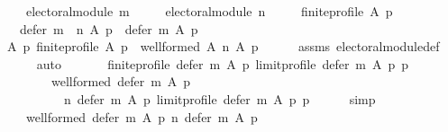\begin{isabellebody}
\ \ \ \ {\isachardoublequoteopen}electoral{\isacharunderscore}{\kern0pt}module\ m{\isachardoublequoteclose}\ \isanewline
\ \ \ \ {\isachardoublequoteopen}electoral{\isacharunderscore}{\kern0pt}module\ n{\isachardoublequoteclose}\ \isanewline
\ \ \ \ {\isachardoublequoteopen}finite{\isacharunderscore}{\kern0pt}profile\ A\ p{\isachardoublequoteclose}\isanewline
\ \ \ {\isachardoublequoteopen}defer\ {\isacharparenleft}{\kern0pt}m\ {\isasymtriangleright}\ n{\isacharparenright}{\kern0pt}\ A\ p\ {\isasymsubseteq}\ defer\ m\ A\ p{\isachardoublequoteclose}\isanewline
%
\isadelimproof
%
\endisadelimproof
%
\isatagproof
{}\isamarkupfalse%
\ {\isacharminus}{\kern0pt}\isanewline
\ \ \isamarkupfalse%
\ {\isachardoublequoteopen}{\isasymforall}A\ p{\isachardot}{\kern0pt}\ finite{\isacharunderscore}{\kern0pt}profile\ A\ p\ {\isasymlongrightarrow}\ well{\isacharunderscore}{\kern0pt}formed\ A\ {\isacharparenleft}{\kern0pt}n\ A\ p{\isacharparenright}{\kern0pt}{\isachardoublequoteclose}\isanewline
\ \ \ \ \isamarkupfalse%
\ assms{\isacharparenleft}{\kern0pt}{}{\isacharparenright}{\kern0pt}\ electoral{\isacharunderscore}{\kern0pt}module{\isacharunderscore}{\kern0pt}def\isanewline
\ \ \ \ \isamarkupfalse%
\ auto\isanewline
\ \ \isamarkupfalse%
\isanewline
\ \ \ \ {\isachardoublequoteopen}finite{\isacharunderscore}{\kern0pt}profile\ {\isacharparenleft}{\kern0pt}defer\ m\ A\ p{\isacharparenright}{\kern0pt}\ {\isacharparenleft}{\kern0pt}limit{\isacharunderscore}{\kern0pt}profile\ {\isacharparenleft}{\kern0pt}defer\ m\ A\ p{\isacharparenright}{\kern0pt}\ p{\isacharparenright}{\kern0pt}\ {\isasymlongrightarrow}\isanewline
\ \ \ \ \ \ \ \ well{\isacharunderscore}{\kern0pt}formed\ {\isacharparenleft}{\kern0pt}defer\ m\ A\ p{\isacharparenright}{\kern0pt}\isanewline
\ \ \ \ \ \ \ \ \ \ {\isacharparenleft}{\kern0pt}n\ {\isacharparenleft}{\kern0pt}defer\ m\ A\ p{\isacharparenright}{\kern0pt}\ {\isacharparenleft}{\kern0pt}limit{\isacharunderscore}{\kern0pt}profile\ {\isacharparenleft}{\kern0pt}defer\ m\ A\ p{\isacharparenright}{\kern0pt}\ p{\isacharparenright}{\kern0pt}{\isacharparenright}{\kern0pt}{\isachardoublequoteclose}\isanewline
\ \ \ \ \isamarkupfalse%
\ simp\isanewline
\ \ \isamarkupfalse%
\isanewline
\ \ \ \ {\isachardoublequoteopen}well{\isacharunderscore}{\kern0pt}formed\ {\isacharparenleft}{\kern0pt}defer\ m\ A\ p{\isacharparenright}{\kern0pt}\ {\isacharparenleft}{\kern0pt}n\ {\isacharparenleft}{\kern0pt}defer\ m\ A\ p{\isacharparenright}{\kern0pt}\isanewline

\end{isabellebody}
